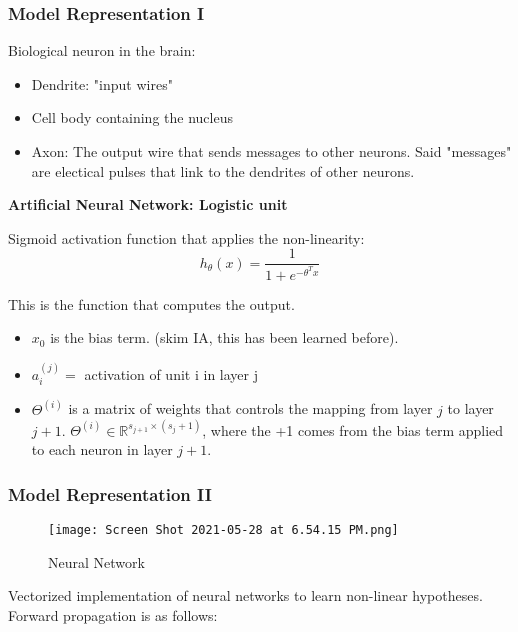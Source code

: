 \documentclass{article}
\begin{document}
\subsubsection{Model Representation I}

Biological neuron in the brain:

\begin{itemize}
    \item Dendrite: "input wires"
    \item Cell body containing the nucleus
    \item Axon: The output wire that sends messages to other neurons. Said "messages" are electical pulses that link to the dendrites of other neurons.
\end{itemize}


\textbf{Artificial Neural Network: Logistic unit}

Sigmoid activation function that applies the non-linearity:
\begin{equation}
    h_{\theta} (x) = \frac{1}{1 + e^{-\theta^T x}}
\end{equation}

This is the function that computes the output. 

\begin{itemize}
\item $x_0$ is the bias term. (skim IA, this has been learned before). 

\item $a_{i}^{(j)} =$ activation of unit i in layer j

\item $\Theta^{(i)}$ is a matrix of weights that controls the mapping from layer $j$ to layer $j+1$. $\Theta^{(i)} \in \mathbb{R}^{s_{j+1} \times  (s_{j} + 1)} $, where the +1 comes from the bias term applied to each neuron in layer $j+1$.
\end{itemize}



\subsubsection{Model Representation II}

\begin{figure}[h]
    \centering
    \texttt{[image: Screen Shot 2021-05-28 at 6.54.15 PM.png]}
    \caption{Neural Network}
    \label{fig:my_labelneural}
\end{figure}


Vectorized implementation of neural networks to learn non-linear hypotheses. Forward propagation is as follows:
\end{document}

